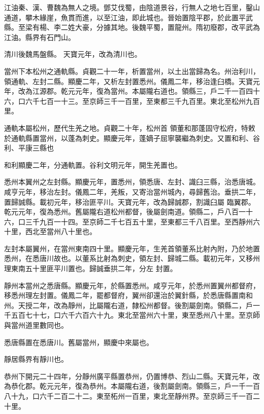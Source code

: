 \begin{pinyinscope}
 江油秦、漢、曹魏為無人之境。鄧艾伐蜀，由陰道景谷，行無人之地七百里，鑿山通道，攀木緣崖，魚貫而進，以至江油，即此城也。晉始置陰平郡，於此置平武縣。至梁有楊、李二姓大豪，分據其地。後魏平蜀，置龍州。隋初廢郡，改平武為江油。縣界有石門山。



 清川後魏馬盤縣。
 天寶元年，改為清川也。



 當州下本松州之通軌縣。貞觀二十一年，析置當州，以土出當歸為名。州治利川，領通軌、左封二縣。顯慶二年，又析左封置悉州。儀鳳二年，移治逢臼橋。天寶元年，改為江源郡。乾元元年，復為當州。本屬隴右道也。領縣三，戶二千一百四十六，口六千七百一十三。至京師三千一百里，至東都三千九百里。東北至松州九百里。



 通軌本屬松州，歷代生羌之地。貞觀二十年，松州首
 領董和那蓬固守松府，特敕於通軌縣置當州，以蓬為刺史。顯慶元年，蓬嫡子屈寧襲繼為刺史。又置和利、谷利、平康三縣也



 和利顯慶二年，分通軌置。谷利文明元年，開生羌置也。



 悉州本翼州之左封縣。顯慶元年，置悉州，領悉唐、左封、識臼三縣，治悉唐城。咸亨元年，移治左封。儀鳳二年，羌叛，又寄治當州城內，尋歸舊治。垂拱二年，置歸誠縣。載初元年，移治匪平川。天寶元年，改為歸誠郡，割識臼屬
 臨翼郡。乾元元年，復為悉州。舊屬隴右道松州都督，後屬劍南道。領縣二，戶八百一十六，口三千九百一十四。至京師二千七百五十里，至東都三千八百里。至西靜州六十里，西北至當州八十里也。



 左封本屬翼州，在當州東南四十里。顯慶元年，生羌首領董系比射內附，乃於地置悉州，在悉唐川故也。以董系比射為刺史，領左封、歸城二縣。載初元年，又移州理東南五十里匪平川置也。歸誠垂拱二年，分左
 封置。



 靜州本當州之悉唐縣。顯慶元年，於縣置悉州。咸亨元年，於悉州置翼州都督府，移悉州理左封置。儀鳳二年，罷都督府，翼州卻還治於翼針縣，於悉唐縣置南和州。天授二年，改為靜州，比屬隴右道，隸松州都督。後割屬劍南。領縣二，戶一千五百七十七，口六千六百六十九。東北至當州六十里，東至悉州八十里。至京師與當州道里數同也。



 悉唐縣置在悉唐川。舊屬當州，顯慶中來屬也。



 靜居縣界有靜川也。



 恭州下開元二十四年，分靜州廣平縣置恭州，仍置博恭、烈山二縣。天寶元年，改為恭化郡。乾元元年，復為恭州。本屬隴右道，後割屬劍南。領縣三，戶一千一百八十九，口六千二百二十二。東至柘州一百里，東北至靜州界。至京師三千一百二十里。




\end{pinyinscope}
